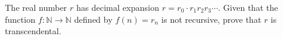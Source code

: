 The real number $r$ has decimal expansion $r = r_0 \cdot r_1 r_2 r_3 \cdots$. Given that the function $f: \mathbb{N} \to \mathbb{N}$ defined by $f(n) = r_n$ is not recursive, prove that $r$ is transcendental.

